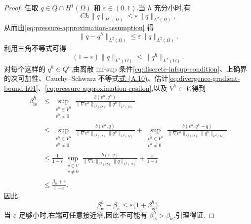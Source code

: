 \begin{proof}
任取 $q\in Q\cap H^1(\Omega)$ 和 $\varepsilon\in(0,1)$.当 $h$ 充分小时,有
\[
  Ch\|q\|_{H^1(\Omega)}\le\varepsilon\|q\|_{L^2(\Omega)},
\]
从而由\cref{eq:pressure-approximation-assumption} 得
\begin{equation}\label{eq:pressure-approximation-epsilon}
  \|q-q^h\|_{L^2(\Omega)}\le\varepsilon\|q\|_{L^2(\Omega)}.
\end{equation}
利用三角不等式可得
\begin{equation}\label{eq:pressure-approximation-lower-bound}
  (1-\varepsilon)\|q\|_{L^2(\Omega)}
     \le\|q^h\|_{L^2(\Omega)}.
\end{equation}
对每个这样的 $q^h\in Q^h$,由离散 inf-sup 条件\cref{eq:discrete-infsup-condition}、上确界的次可加性、Cauchy--Schwarz 不等式\hyperref[eq:appendix-a-10]{式 (A.10)}、估计\cref{eq:divergence-gradient-bound-h01}、\cref{eq:pressure-approximation-epsilon},以及 $V^h\subset V$,得到
\[
\begin{aligned}
  \beta_{\mathrm{is}}^h
   &\le\sup_{\substack{v^h\in V^h\\v^h\ne0}}
      \frac{b(v^h,q^h)}{\|\nabla v^h\|_{L^2(\Omega)}\|q^h\|_{L^2(\Omega)}}\\
   &\le\sup_{\substack{v^h\in V^h\\v^h\ne0}}
      \frac{b(v^h,q)}{\|\nabla v^h\|_{L^2(\Omega)}\|q^h\|_{L^2(\Omega)}}
     +\sup_{\substack{v^h\in V^h\\v^h\ne0}}
      \frac{b(v^h,q^h-q)}{\|\nabla v^h\|_{L^2(\Omega)}\|q^h\|_{L^2(\Omega)}}\\
   &\le\frac{1}{1-\varepsilon}
      \sup_{\substack{v\in V\\v\ne0}}
        \frac{b(v,q)}{\|\nabla v\|_{L^2(\Omega)}\|q\|_{L^2(\Omega)}}
      +\frac{\varepsilon}{1-\varepsilon}\\
   &\le\frac{\beta_{\mathrm{is}}+\varepsilon}{1-\varepsilon}.
\end{aligned}
\]
因此
\[
  \beta_{\mathrm{is}}^h-\beta_{\mathrm{is}}
    \le\varepsilon\bigl(1+\beta_{\mathrm{is}}^h\bigr).
\]
当 $\varepsilon$ 足够小时,右端可任意接近零,因此不可能有 $\beta_{\mathrm{is}}^h>\beta_{\mathrm{is}}$,引理得证.
\end{proof}

